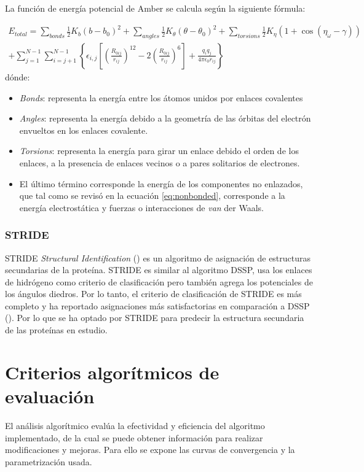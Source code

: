 La función de energía potencial de Amber se calcula según la siguiente fórmula:

\begin{equation}
\begin{split}
E_{total}=\sum_{bonds}\frac{1}{2}K_{b}(b-b_{0})^2 + \sum_{angles}\frac{1}{2}K_{\theta}(\theta-\theta_{0})^2 + \sum_{torsions}\frac{1}{2}K_{\eta}(1+\cos(\eta_{\omega}-\gamma)) \\
+ \sum_{j=1}^{N-1}\sum_{i=j+1}^{N-1}\left\{ \epsilon_{i,j}\left[ \left( \frac{R_{0ij}}{r_{ij}} \right)^{12}-2\left( \frac{R_{0ij}}{r_{ij}} \right)^{6} \right] + \frac{q_{i}q_{j}}{4\pi\epsilon_{0}r_{ij}} \right\}
\end{split}
\end{equation}
dónde:
\begin{itemize}
	\item \textit{Bonds}: representa la energía entre los átomos unidos por enlaces covalentes
	\item \textit{Angles}: representa la energía debido a la geometría de las órbitas del electrón envueltos en los enlaces covalente.
	\item \textit{Torsions}: representa la energía para girar un enlace debido el orden de los enlaces, a la presencia de enlaces vecinos o a pares solitarios de electrones.
	\item El último término corresponde la energía de los componentes no enlazados, que tal como se revisó en la ecuación \ref{eq:nonbonded}, corresponde a la energía electrostática y fuerzas o interacciones de \textit{van} der Waals.
\end{itemize}

\subsubsection{STRIDE}
STRIDE \textit{Structural Identification} (\citealp{stridepaper}) es un algoritmo de asignación de estructuras secundarias de la proteína. STRIDE es similar al algoritmo DSSP, usa los enlaces de hidrógeno como criterio de clasificación pero también agrega los potenciales de los ángulos diedros. Por lo tanto, el criterio de clasificación de STRIDE es más completo y ha reportado asignaciones más satisfactorias en comparación a DSSP (\citealp{zhang:2015}). Por lo que se ha optado por STRIDE para predecir la estructura secundaria de las proteínas en estudio.


\section{Criterios algorítmicos de evaluación }
El análisis algorítmico evalúa la efectividad y eficiencia del algoritmo implementado, de la cual se puede obtener información para realizar modificaciones y mejoras. Para ello se expone las curvas de convergencia y la parametrización usada.


